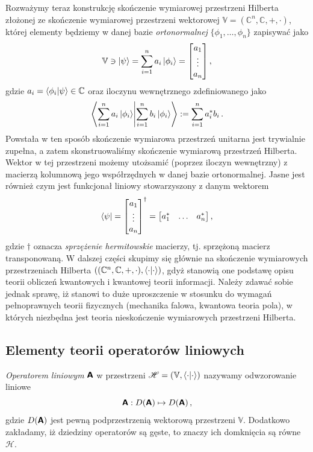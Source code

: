 \documentclass{myclass}
\begin{document}
Rozważymy teraz konstrukcję skończenie wymiarowej przestrzeni Hilberta złożonej ze skończenie
wymiarowej przestrzeni wektorowej \(\mathbb{V} = (\mathbb{C}^n, \mathbb{C}, +, \cdot)\), której
elementy będziemy w danej bazie \textit{ortonormalnej} \(\{\phi_1, \ldots, \phi_n\}\) zapisywać jako
\begin{equation*}
    \mathbb{V} \ni \ket{\psi} = \sum_{i=1}^n a_i \ket{\phi_i} = \mqty[a_1 \\ \vdots \\ a_n]\,,
\end{equation*}
gdzie \(a_i = \braket{\phi_i}{\psi}\in\mathbb{C}\) oraz iloczynu wewnętrznego zdefiniowanego jako
\begin{equation*}
    \braket{ \sum_{i=1}^n a_i \ket{\phi_i}}{ \sum_{i=1}^n b_i \ket{\phi_i}} := \sum_{i=1}^n a_{i}^*b_i\,.
\end{equation*}
Powstała w ten sposób skończenie wymiarowa przestrzeń unitarna jest trywialnie zupełna, a zatem
skonstruowaliśmy skończenie wymiarową przestrzeń Hilberta. Wektor w tej przestrzeni możemy utożsamić
(poprzez iloczyn wewnętrzny) z macierzą kolumnową jego współrzędnych w danej bazie ortonormalnej.
Jasne jest również czym jest funkcjonał liniowy stowarzyszony z danym wektorem
\begin{equation*}
    \bra{\psi} = \mqty[a_1 \\ \vdots \\ a_n]^\dagger = \mqty[a_1^* & \ldots & a_n^*]\,,
\end{equation*}
gdzie \(\dagger\) oznacza \textit{sprzężenie hermitowskie} macierzy, tj. sprzężoną macierz
transponowaną. W dalszej części skupimy się głównie na skończenie wymiarowych przestrzeniach
Hilberta \(((\mathbb{C}^n, \mathbb{C}, +, \cdot),\braket{\cdot})\), gdyż stanowią one podstawę opisu
teorii obliczeń kwantowych i kwantowej teorii informacji. Należy zdawać sobie jednak sprawę, iż
stanowi to duże uproszczenie w stosunku do wymagań pełnoprawnych teorii fizycznych (mechanika
falowa, kwantowa teoria pola), w których niezbędna jest teoria nieskończenie wymiarowych przestrzeni
Hilberta.

\subsection{Elementy teorii operatorów liniowych}

\begin{definition}
\textit{Operatorem liniowym} \(\boldsymbol{\mathsf{A}}\) w przestrzeni \(\mathscr{H} = (\mathbb{V},
\braket{\cdot})\) nazywamy odwzorowanie liniowe 
\begin{equation*}
    \boldsymbol{\mathsf{A}} : D(\boldsymbol{\mathsf{A}}) \mapsto D(\boldsymbol{\mathsf{A}})\,,
\end{equation*}
gdzie \(D(\boldsymbol{\mathsf{A}})\) jest pewną podprzestrzenią wektorową przestrzeni \(\mathbb{V}\). Dodatkowo
zakładamy, iż dziedziny operatorów są gęste, to znaczy ich domknięcia są równe \(\mathscr{H}\).
\end{definition}
\end{document}
